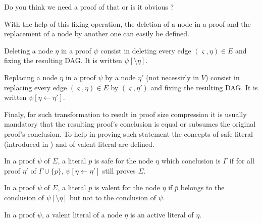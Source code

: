 \documentclass{llncs}
\newcommand{\dual}[1]{{\ensuremath{\bar{#1}}}}
\newenvironment{jogo}{\color{teal}}{}
\begin{document}
\begin{jogo}
Do you think we need a proof of that or is it obvious ?
\end{jogo}

With the help of this fixing operation, the deletion of a node in a proof and the replacement of a
node by another one can easily be defined.

\begin{definition}
Deleting a node $\eta$ in a proof $\psi$ consist in deleting every edge $(\varsigma,\eta) \in E$ and
fixing the resulting DAG. It is written $\psi[\setminus \eta]$.
\end{definition}

\begin{definition}
Replacing a node $\eta$ in a proof $\psi$ by a node $\eta'$ (not necessirly in $V$) consist in
replacing every edge $(\varsigma,\eta) \in E$ by $(\varsigma,\eta')$ and fixing the resulting DAG.
It is written $\psi[\eta \leftarrow \eta']$.
\end{definition}

Finaly, for such transformation to result in proof size compression it is usually mandatory that the
resulting proof's conclusion is equal or subsumes the original proof's conclusion. To help in
proving such statement the concepts of safe literal (introduced in \cite{RPILU}) and of valent
literal are defined.

\begin{definition}
In a proof $\psi$ of $\Sigma$, a literal $p$ is safe for the node $\eta$ which conclusion is $\Gamma$ if
for all proof $\eta'$ of $\Gamma \cup \{p\}$, $\psi[\eta \leftarrow \eta']$ still proves $\Sigma$.
\end{definition}

\begin{definition}
In a proof $\psi$ of $\Sigma$, a literal $p$ is valent for the node $\eta$ if $\dual{p}$ belongs to
the conclusion of $\psi[\setminus \eta]$ but not to the conclusion of $\psi$.
\end{definition}

\begin{proposition}
In a proof $\psi$, a valent literal of a node $\eta$ is an active literal of $\eta$.
\end{proposition}
\end{document}
